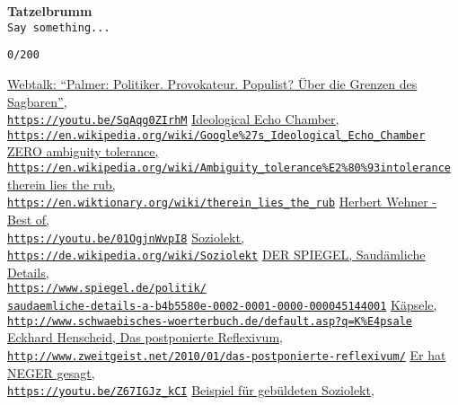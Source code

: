 \documentclass[a4,parindent=0pt]{article}
\begin{document}
\textbf{Tatzelbrumm}\\
\texttt{Say\ something...}

\texttt{0/200}

\begin{thebibliography}{88}
  \href{https://youtu.be/SqAqg0ZIrhM}{Webtalk: ``Palmer: Politiker.
  Provokateur. Populist? Über die Grenzen des Sagbaren'',\\
\texttt{https://youtu.be/SqAqg0ZIrhM}}
  \href{https://en.wikipedia.org/wiki/Google\%27s_Ideological_Echo_Chamber}{Ideological
  Echo Chamber,\\
\texttt{https://en.wikipedia.org/wiki/Google\%27s\_Ideological\_Echo\_Chamber}}
  \href{https://en.wikipedia.org/wiki/Ambiguity_tolerance\%E2\%80\%93intolerance}{ZERO
  ambiguity tolerance,\\
\texttt{https://en.wikipedia.org/wiki/Ambiguity\_tolerance\%E2\%80\%93intolerance}}
  \href{https://en.wiktionary.org/wiki/therein_lies_the_rub}{therein
  lies the rub,\\
\texttt{https://en.wiktionary.org/wiki/therein\_lies\_the\_rub}}
  \href{https://youtu.be/01OgjnWvpI8}{Herbert Wehner - Best of,\\
\texttt{https://youtu.be/01OgjnWvpI8}}
  \href{https://de.wikipedia.org/wiki/Soziolekt}{Soziolekt,\\
\texttt{https://de.wikipedia.org/wiki/Soziolekt}}
  \href{https://www.spiegel.de/politik/saudaemliche-details-a-b4b5580e-0002-0001-0000-000045144001}{DER SPIEGEL, Saudämliche
  Details,\\
\texttt{https://www.spiegel.de/politik/\\saudaemliche-details-a-b4b5580e-0002-0001-0000-000045144001}}
  \href{http://www.schwaebisches-woerterbuch.de/default.asp?q=K\%E4psale}{Käpsele,\\
\texttt{http://www.schwaebisches-woerterbuch.de/default.asp?q=K\%E4psale}}
  \href{http://www.zweitgeist.net/2010/01/das-postponierte-reflexivum/}{Eckhard Henscheid, Das
  postponierte Reflexivum,\\
\texttt{http://www.zweitgeist.net/2010/01/das-postponierte-reflexivum/}}
  \href{https://youtu.be/Z67IGJz_kCI}{Er hat NEGER gesagt,\\
\texttt{https://youtu.be/Z67IGJz\_kCI}}
  \href{https://www.facebook.com/ob.boris.palmer/posts/1115759598463571?comment_id=1115864995119698}{Beispiel für gebüldeten Soziolekt,\\
}
\end{thebibliography}
\end{document}
